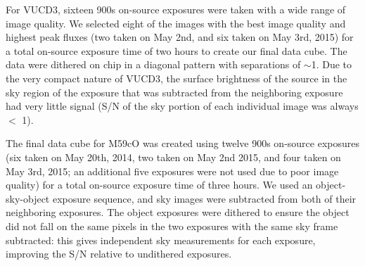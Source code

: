\documentclass{aastex}
\begin{document}
For VUCD3, sixteen 900s on-source exposures were taken with a wide range of image quality. We selected eight of the images with the best image quality and highest peak fluxes (two taken on May 2nd, and six taken on May 3rd, 2015) for a total on-source exposure time of two hours to create our final data cube. The data were dithered on chip in a diagonal pattern with separations of $\sim$1\arcsec. Due to the very compact nature of VUCD3, the surface brightness of the source in the sky region of the exposure that was subtracted from the neighboring exposure had very little signal (S/N of the sky portion of each individual image was always $<$ 1).

The final data cube for M59cO was created using twelve 900s on-source exposures (six taken on May 20th, 2014, two taken on May 2nd 2015, and four taken on May 3rd, 2015; an additional five exposures were not used due to poor image quality) for a total on-source exposure time of three hours. We used an object-sky-object exposure sequence, and sky images were subtracted from both of their neighboring exposures. The object exposures were dithered to ensure the object did not fall on the same pixels in the two exposures with the same sky frame subtracted: this gives independent sky measurements for each exposure, improving the S/N relative to undithered exposures.
\end{document}
